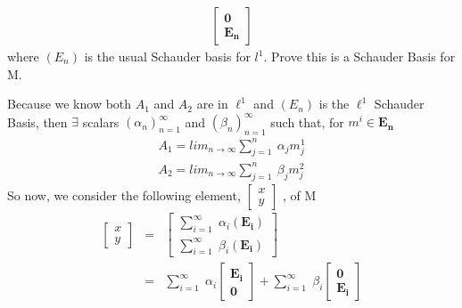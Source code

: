 \documentclass[11pt]{SelfArxOneColBMN}
\begin{document}
\begin{exercise}
\begin{itemize}
\begin{eqnarray*}
            \begin{bmatrix}
                \mathbf{0}\\
                \mathbf{E_n}
            \end{bmatrix}
        \end{eqnarray*}
        where $(E_n)$ is the usual Schauder basis for $l^1$. Prove this is a Schauder Basis for M.
        \begin{solution}
            Because we know both $A_1$ and $A_2$ are in $\ell^1$ and $(E_n)$ is the $\ell^1$ Schauder Basis, then $\exists$ scalars $(\alpha_n)_{n=1}^\infty$ and $(\beta_n)_{n=1}^\infty$ such that, for $m^i \in \mathbf{E_n}$
            \begin{eqnarray*}
                A_1 = lim_{n\rightarrow \infty}\sum_{j=1}^n\:\alpha_j m^1_j\\
                A_2 = lim_{n\rightarrow \infty}\sum_{j=1}^n\:\beta_j m^2_j
            \end{eqnarray*}
            So now, we consider the following element,
            $
            \begin{bmatrix}
            x\\
            y
            \end{bmatrix}
            $
            , of M
            \begin{eqnarray*}
                \begin{bmatrix}
                    x\\
                    y
                \end{bmatrix}
                &=&
                \begin{bmatrix}
                    \sum_{i=1}^\infty\;\alpha_i\mathbf{(E_i)}\\
                    \sum_{i=1}^\infty\;\beta_i\mathbf{(E_i)}
                \end{bmatrix}
                \\
                &=& \sum_{i=1}^\infty\;\alpha_i
                \begin{bmatrix}
                    \mathbf{E_i}\\
                    \mathbf{0}
                \end{bmatrix}
                + \sum_{i=1}^\infty\;\beta_i
                \begin{bmatrix}
                    \mathbf{0}\\
                    \mathbf{E_i}
                \end{bmatrix}
                \\

\end{eqnarray*}
\end{solution}
\end{itemize}
\end{exercise}
\end{document}
